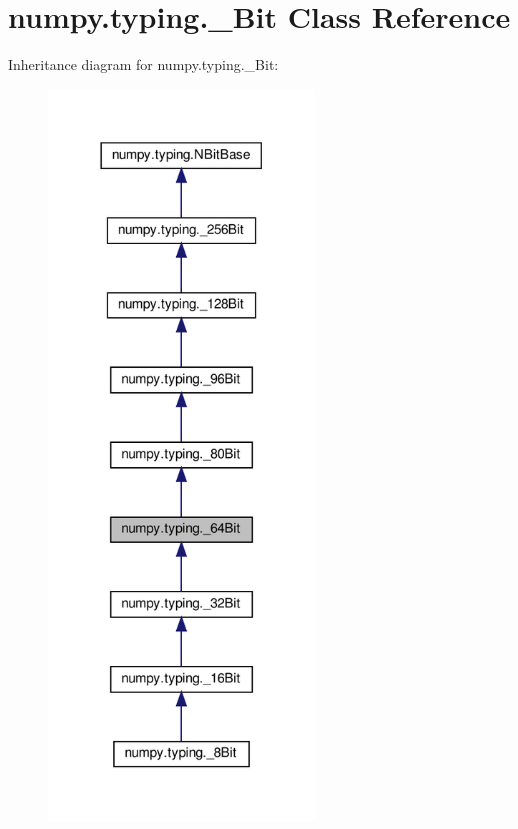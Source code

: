 \hypertarget{classnumpy_1_1typing_1_1__64Bit}{}\section{numpy.\+typing.\+\_\+Bit Class Reference}
\label{classnumpy_1_1typing_1_1__64Bit}


Inheritance diagram for numpy.\+typing.\+\_\+Bit\+:
\nopagebreak
\begin{figure}[H]
\begin{center}
\leavevmode
\includegraphics[width=200pt]{classnumpy_1_1typing_1_1__64Bit__inherit__graph}
\end{center}
\end{figure}


